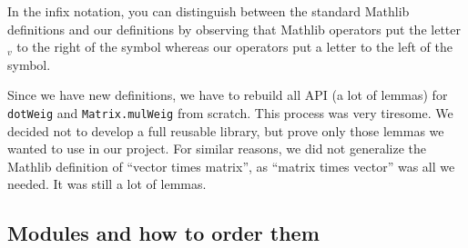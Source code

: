 \documentclass[]{article}
\renewcommand{\.}{\hskip .75pt}
\begin{document}
In the infix notation, you can distinguish between the standard
Mathlib definitions and our definitions by observing that Mathlib
operators put the letter $_v$ to the right of the symbol whereas
our operators put a letter to the left of the symbol.

Since we have new definitions, we have to rebuild all API (a lot of lemmas)
for \texttt{dotWeig} and \texttt{Matrix.mulWeig} from scratch.
This process was very tiresome. We decided not to develop a full reusable
library, but prove only those lemmas we wanted to use in our project.
For similar reasons, we did not generalize the Mathlib definition of
``vector times matrix'', as ``matrix times vector'' was all we needed.
It was still a lot of lemmas.

\subsection{Modules and how to order them}
\label{preliminaries-modules}
\end{document}
